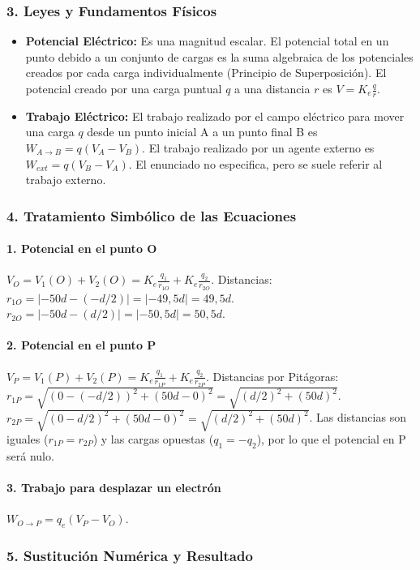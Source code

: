 \subsubsection*{3. Leyes y Fundamentos Físicos}
\begin{itemize}
    \item \textbf{Potencial Eléctrico:} Es una magnitud escalar. El potencial total en un punto debido a un conjunto de cargas es la suma algebraica de los potenciales creados por cada carga individualmente (Principio de Superposición). El potencial creado por una carga puntual $q$ a una distancia $r$ es $V = K_e \frac{q}{r}$.
    \item \textbf{Trabajo Eléctrico:} El trabajo realizado por el campo eléctrico para mover una carga $q$ desde un punto inicial A a un punto final B es $W_{A \to B} = q(V_A - V_B)$. El trabajo realizado por un agente externo es $W_{ext} = q(V_B - V_A)$. El enunciado no especifica, pero se suele referir al trabajo externo.
\end{itemize}

\subsubsection*{4. Tratamiento Simbólico de las Ecuaciones}
\paragraph{1. Potencial en el punto O}
$ V_O = V_1(O) + V_2(O) = K_e \frac{q_1}{r_{1O}} + K_e \frac{q_2}{r_{2O}} $.
Distancias: $r_{1O} = |-50d - (-d/2)| = |-49,5d| = 49,5d$.
$r_{2O} = |-50d - (d/2)| = |-50,5d| = 50,5d$.
\paragraph{2. Potencial en el punto P}
$ V_P = V_1(P) + V_2(P) = K_e \frac{q_1}{r_{1P}} + K_e \frac{q_2}{r_{2P}} $.
Distancias por Pitágoras:
$r_{1P} = \sqrt{(0 - (-d/2))^2 + (50d - 0)^2} = \sqrt{(d/2)^2 + (50d)^2}$.
$r_{2P} = \sqrt{(0 - d/2)^2 + (50d - 0)^2} = \sqrt{(d/2)^2 + (50d)^2}$.
Las distancias son iguales ($r_{1P}=r_{2P}$) y las cargas opuestas ($q_1=-q_2$), por lo que el potencial en P será nulo.
\paragraph{3. Trabajo para desplazar un electrón}
$ W_{O \to P} = q_e(V_P - V_O) $.

\subsubsection*{5. Sustitución Numérica y Resultado}
